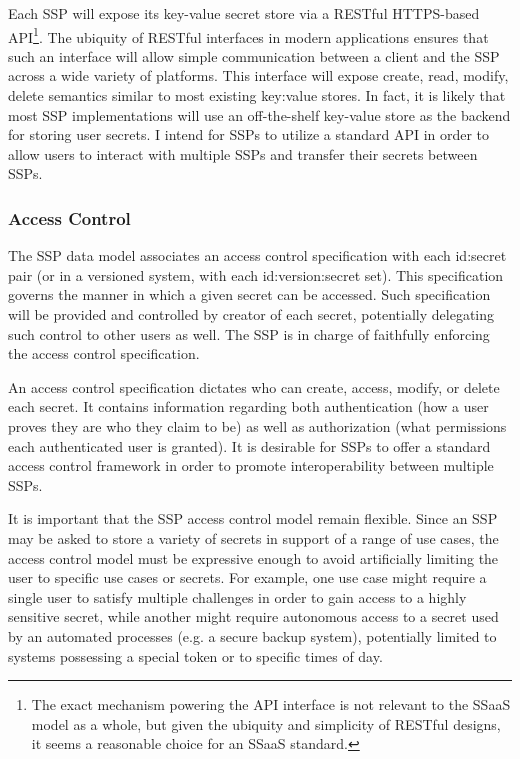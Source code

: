 Each SSP will expose its key-value secret store via a RESTful
HTTPS-based API\footnote{The exact mechanism powering the API
  interface is not relevant to the SSaaS model as a whole, but given
  the ubiquity and simplicity of RESTful designs, it seems a
  reasonable choice for an SSaaS standard.}. The ubiquity of RESTful
interfaces in modern applications ensures that such an interface will
allow simple communication between a client and the SSP across a wide
variety of platforms. This interface will expose create, read, modify,
delete semantics similar to most existing key:value stores. In fact,
it is likely that most SSP implementations will use an off-the-shelf
key-value store as the backend for storing user secrets. I intend for
SSPs to utilize a standard API in order to allow users to interact with
multiple SSPs and transfer their secrets between SSPs.

\subsubsection{Access Control}

The SSP data model associates an access control specification with
each id:secret pair (or in a versioned system, with each
id:version:secret set). This specification governs the manner in which
a given secret can be accessed. Such specification will be provided
and controlled by creator of each secret, potentially delegating such
control to other users as well. The SSP is in charge of faithfully
enforcing the access control specification.

An access control specification dictates who can create, access,
modify, or delete each secret. It contains information regarding both
authentication (how a user proves they are who they claim to be) as
well as authorization (what permissions each authenticated user is
granted). It is desirable for SSPs to offer a standard access control
framework in order to promote interoperability between multiple SSPs.

It is important that the SSP access control model remain
flexible. Since an SSP may be asked to store a variety of secrets in
support of a range of use cases, the access control model must be
expressive enough to avoid artificially limiting the user to specific
use cases or secrets. For example, one use case might require a single
user to satisfy multiple challenges in order to gain access to a
highly sensitive secret, while another might require autonomous access
to a secret used by an automated processes (e.g. a secure backup
system), potentially limited to systems possessing a special token or
to specific times of day.

